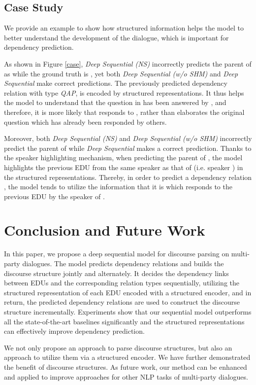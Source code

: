 \documentclass[letterpaper]{article} \usepackage{aaai19}  \usepackage{times}  \usepackage{helvet}  \usepackage{courier}  \usepackage{url}  \usepackage{graphicx}  \usepackage{amssymb}
\begin{document}
\subsection{Case Study}
We provide an example to show how structured information helps the model to better understand the development of the dialogue, which is important for dependency prediction.

As shown in Figure \ref{case}, \emph{Deep Sequential (NS)} incorrectly predicts the parent of  as  while the ground truth is , yet both \emph{Deep Sequential (w/o SHM)} and \emph{Deep Sequential} make correct predictions.
The previously predicted dependency relation  with type \emph{QAP}, is encoded by structured representations.
It thus helps the model to understand that the question in  has been answered by , and therefore, it is more likely that  responds to , rather than elaborates the original question  which has already been responded by others.

Moreover, both \emph{Deep Sequential (NS)} and \emph{Deep Sequential (w/o SHM)} incorrectly predict the parent of  while \emph{Deep Sequential} makes a correct prediction. 
Thanks to the speaker highlighting mechanism, when predicting the parent of , the model highlights the previous EDU  from the same speaker as that of  (i.e. speaker ) in the structured representations.
Thereby, in order to predict a dependency relation , the model tends to utilize the information that 
it is  which responds to the previous EDU  by the speaker of .

\section{Conclusion and Future Work}

In this paper, we propose a deep sequential model for discourse parsing on multi-party dialogues. The model predicts dependency relations and builds the discourse structure jointly and alternately. It decides the dependency links between EDUs and the corresponding relation types sequentially, utilizing the structured representation of each EDU encoded with a structured encoder, and in return, the predicted dependency relations are used to construct the discourse structure incrementally.
Experiments show that our sequential model outperforms all the state-of-the-art baselines significantly and the structured representations can effectively improve dependency prediction.

We not only propose an approach to parse discourse structures, but also an approach to utilize them via a structured encoder. We have further demonstrated the benefit of discourse structures. As future work, our method can be enhanced and applied to improve approaches for other NLP tasks of multi-party dialogues.
\end{document}
